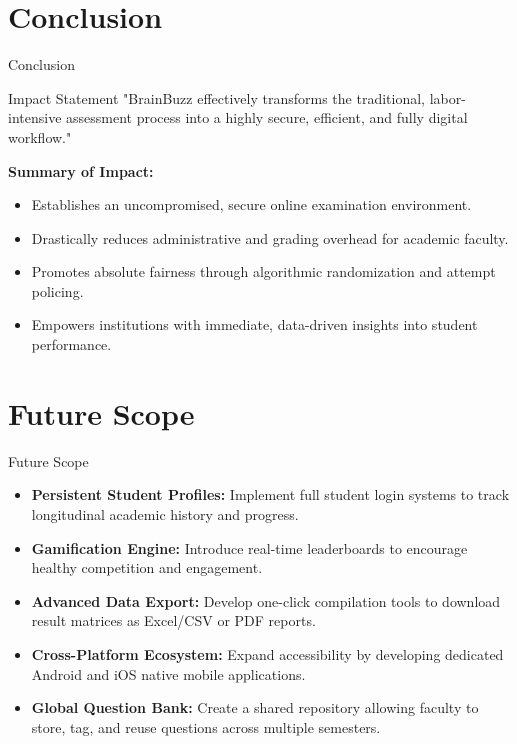 \documentclass[aspectratio=169, 11pt]{beamer}
\begin{document}
\section{Conclusion}
\begin{frame}{Conclusion}
    \begin{block}{Impact Statement}
        "BrainBuzz effectively transforms the traditional, labor-intensive assessment process into a highly secure, efficient, and fully digital workflow."
    \end{block}
    \vspace{0.3cm}
    \textbf{Summary of Impact:}
    \begin{itemize}
        \item Establishes an uncompromised, secure online examination environment.
        \item Drastically reduces administrative and grading overhead for academic faculty.
        \item Promotes absolute fairness through algorithmic randomization and attempt policing.
        \item Empowers institutions with immediate, data-driven insights into student performance.
    \end{itemize}
\end{frame}

\section{Future Scope}
\begin{frame}{Future Scope}
    \begin{itemize}
        \item \textbf{Persistent Student Profiles:} Implement full student login systems to track longitudinal academic history and progress.
        \item \textbf{Gamification Engine:} Introduce real-time leaderboards to encourage healthy competition and engagement.
        \item \textbf{Advanced Data Export:} Develop one-click compilation tools to download result matrices as Excel/CSV or PDF reports.
        \item \textbf{Cross-Platform Ecosystem:} Expand accessibility by developing dedicated Android and iOS native mobile applications.
        \item \textbf{Global Question Bank:} Create a shared repository allowing faculty to store, tag, and reuse questions across multiple semesters.
    \end{itemize}
\end{frame}
\end{document}

